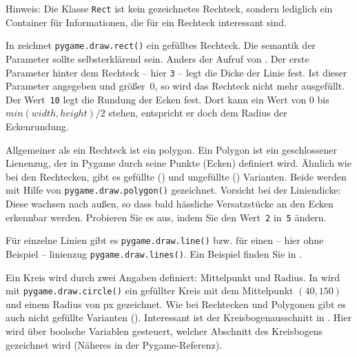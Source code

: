 Hinweis: Die Klasse \texttt{Rect} ist kein gezeichnetes Rechteck, sondern lediglich ein Container für Informationen, die für ein Rechteck interessant sind. 

In  zeichnet \texttt{pygame.draw.rect()} ein gefülltes Rechteck. Die \Gls{semantik} der Parameter sollte selbsterklärend sein. Anders der Aufruf von . Der erste Parameter hinter dem Rechteck -- hier \texttt{3} -- legt die Dicke der Linie fest. Ist dieser Parameter angegeben und größer~0, so wird das Rechteck nicht mehr ausgefüllt. Der Wert~\texttt{10} legt die Rundung der Ecken fest. Dort kann ein Wert von 0 bis $min(width, height)/2$ stehen, entspricht er doch dem Radius der Eckenrundung.

Allgemeiner als ein Rechteck ist ein \Gls{polygon}. Ein Polygon ist ein geschlossener Lienenzug, der in Pygame durch seine Punkte (Ecken) definiert wird. Ähnlich wie bei den Rechtecken, gibt es gefüllte () und ungefüllte () Varianten. Beide werden mit Hilfe von \texttt{pygame.draw.polygon()} gezeichnet. Vorsicht bei der Liniendicke: Diese wachsen nach außen, so dass bald hässliche Versatzstücke an den Ecken erkennbar werden. Probieren Sie es aus, indem Sie den Wert~\texttt{2} in~\texttt{5} ändern.

Für einzelne Linien gibt es \texttt{pygame.draw.line()} bzw. für einen -- hier ohne Beispiel -- \gls{linienzug} \texttt{pygame.draw.lines()}. Ein Beispiel finden Sie in .

Ein Kreis wird durch zwei Angaben definiert: Mittelpunkt und Radius. In  wird mit \texttt{pygame.draw.circle()} ein gefüllter Kreis mit dem Mittelpunkt $(40, 150)$ und einem Radius von \unit[30]{px} gezeichnet. Wie bei Rechtecken und Polygonen gibt es auch nicht gefüllte Varianten (). Interessant ist der Kreisbogenausschnitt in . Hier wird über boolsche Variablen gesteuert, welcher Abschnitt des Kreisbogens gezeichnet wird (Näheres in der Pygame-Referenz).

